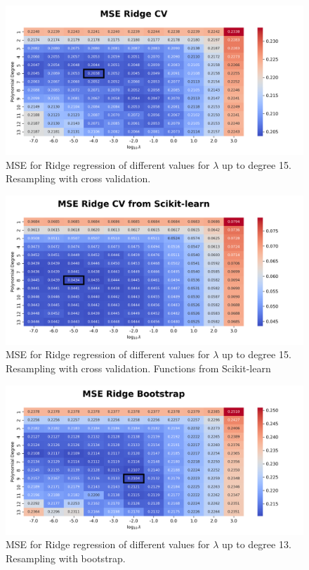 \documentclass{article}
\begin{document}
\begin{figure}[htbp]
    \centering
    \includegraphics[width=\textwidth]{Project1/figures/Franke/Heatmap_MSE_Ridge_CV.png}
    \caption{MSE for Ridge regression of different values for $\lambda$ up to degree 15. Resampling with cross validation.}
    \label{fig:RidgeCV}
\end{figure}

\begin{figure}[htbp]
    \centering
    \includegraphics[width=\textwidth]{Project1/figures/Franke/Heatmap_MSE_Ridge_CV_from_Scikit-learn.png}
    \caption{MSE for Ridge regression of different values for $\lambda$ up to degree 15. Resampling with cross validation. Functions from Scikit-learn}
    \label{fig:RidgeCVsklearn}
\end{figure}

\begin{figure}[htbp]
    \centering
    \includegraphics[width=\textwidth]{Project1/figures/Franke/Heatmap_MSE_Ridge_Bootstrap.png}
    \caption{MSE for Ridge regression of different values for $\lambda$ up to degree 13. Resampling with bootstrap.}
    \label{fig:RidgeBootstrap}
\end{figure}
\end{document}
